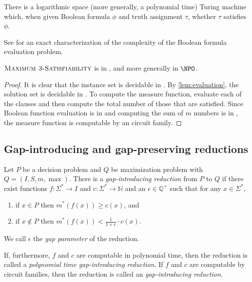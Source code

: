 \documentclass[]{article}
\begin{document}
\begin{lemma}\label{lem:evaluation}
  There is a logarithmic space (more generally, a polynomial time) Turing machine which, when given Boolean formula $\phi$ and truth assignment $\tau$, whether $\tau$ satisfies $\phi$.
\end{lemma}

See \cite{buss87} for an exact characterization of the complexity of the Boolean formula evaluation problem.

\begin{lemma}\label{lem:maxsatnnco}
  $\textsc{Maximum 3-Satisfiability}$ is in \NNCO, and more generally in $\NPO$.
\end{lemma}
\begin{proof}
  It is clear that the instance set is decidable in \NC.
  By \autoref{lem:evaluation}, the solution set is decidable in \NC.
  To compute the measure function, evaluate each of the clauses and then compute the total number of those that are satisfied.
  Since Boolean function evaluation is in \NC{} and computing the sum of $m$ numbers is in \NC, the measure function is computable by an \NC{} circuit family.
\end{proof}

\subsection{Gap-introducing and gap-preserving reductions}\label{ssc:gaps}

\begin{definition}\label{def:intro}
  Let $P$ be a decision problem and $Q$ be maximization problem with $Q = (I, S, m, \max)$.
  There is a \emph{gap-introducing reduction} from $P$ to $Q$ if there exist functions $f \colon \Sigma^* \to I$ and $c \colon \Sigma^* \to \mathbb{N}$ and an $\epsilon \in \mathbb{Q}^+$ such that for any $x \in \Sigma^*$,
  \begin{enumerate}
  \item if $x \in P$ then $m^*(f(x)) \geq c(x)$, and
  \item if $x \notin P$ then $m^*(f(x)) < \frac{1}{1 + \epsilon} \cdot c(x)$.
  \end{enumerate}
  We call $\epsilon$ the \emph{gap parameter} of the reduction.

  If, furthermore, $f$ and $c$ are computable in polynomial time, then the reduction is called a \emph{polynomial time gap-introducing reduction}.
  If $f$ and $c$ are computable by \FNC{} circuit families, then the reduction is called an \emph{\NC{} gap-introducing reduction}.
\end{definition}
\end{document}
